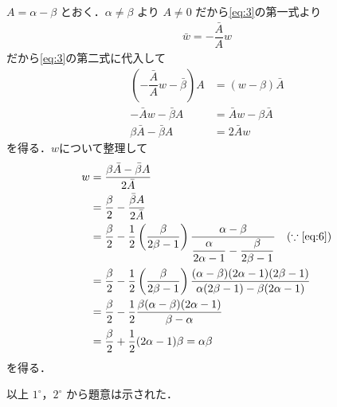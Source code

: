\documentclass[../../main.tex]{subfiles}
\begin{document}
$A = \alpha - \beta$ とおく．$\alpha \neq \beta$ より $A \neq 0$ だから\cref{eq:3}の第一式より
\begin{align}
  \bar{w} = -\dfrac{\bar{A}}{A}w
\end{align}
だから\cref{eq:3}の第二式に代入して
\begin{align}
  \left(-\dfrac{\bar{A}}{A}w - \bar{\beta}\right)A &= (w - \beta)\bar{A} \\
  -\bar{A}w - \bar{\beta}A &= \bar{A}w - \beta\bar{A} \\
  \beta\bar{A} - \bar{\beta}A &= 2\bar{A}w
\end{align}
を得る．$w$について整理して
\begin{align}
  w
  &= \dfrac{\beta\bar{A} - \bar{\beta}A}{2\bar{A}} \\
  &= \dfrac{\beta}{2} - \dfrac{\bar{\beta}A}{2\bar{A}} \\
  &= \dfrac{\beta}{2} - \dfrac{1}{2} \left( \dfrac{\beta}{2\beta-1} \right) \dfrac{\alpha-\beta}{\dfrac{\alpha}{2\alpha-1} - \dfrac{\beta}{2\beta-1}} \quad (\because \text{\cref{eq:6}}) \\
  &= \dfrac{\beta}{2} - \dfrac{1}{2} \left( \dfrac{\beta}{2\beta-1} \right) \dfrac{(\alpha-\beta)(2\alpha-1)(2\beta-1)}{\alpha(2\beta-1) - \beta(2\alpha-1)} \\
  &= \dfrac{\beta}{2} - \dfrac{1}{2} \dfrac{\beta(\alpha-\beta)(2\alpha-1)}{\beta-\alpha} \\
  &= \dfrac{\beta}{2} + \dfrac{1}{2} (2\alpha-1)\beta = \alpha\beta
\end{align}
を得る．
\casesend

以上 $1^\circ$，$2^\circ$ から題意は示された．
\end{document}
